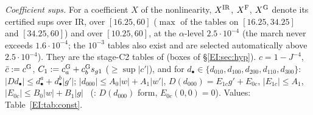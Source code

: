 \documentclass[11pt]{article}
\begin{document}
\noindent\emph{Coefficient sups.} For a coefficient $X$ of the nonlinearity, $X^{\rm IR}$, $X^{\rm F}$, $X^{\rm G}$ denote its certified sups over IR, over $[16.25,60]$ ($\max$ of the tables on $[16.25,34.25]$ and $[34.25,60]$) and over $[10.25,60]$, at the $\alpha$-level $2.5\cdot10^{-4}$ (the march never exceeds $1.6\cdot10^{-4}$; the $10^{-3}$ tables also exist and are selected automatically above $2.5\cdot10^{-4}$). They are the stage-C2 tables of  (boxes of \S\ref{EI:sec:hyp}). $c=1-J^{-4}$, $\bar c:=c^{\rm G}$, $C_1:=c_a^{\rm G}+c_b^{\rm G}s_{g1}$ ($\ge\sup|c'|$), and for $d_\bullet\in\{d_{010},d_{100},d_{200},d_{110},d_{300}\}$: $|Dd_\bullet|\le d_\bullet^a+d^b_\bullet|g'|$; $|d_{000}|\le A_0|w|+A_1|w'|$, $D(d_{000})=E_{1c}g'+E_{0c}$, $|E_{1c}|\le A_1$, $|E_{0c}|\le B_0|w|+B_1|g|$ \tS\ (: $D(d_{000})$ form, $E_{0c}(0,0)=0$). Values: Table~\ref{EI:tab:const}.
\end{document}
